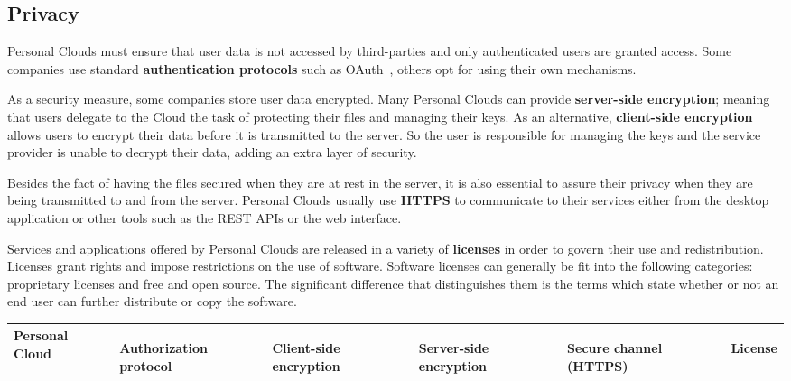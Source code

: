 {\subsection{Privacy}


Personal Clouds must ensure that user data is not accessed by third-parties and only authenticated users are granted access. Some companies use standard \textbf{authentication protocols} such as OAuth~\cite{oauth}, others opt for using their own mechanisms.

As a security measure, some companies store user data encrypted. Many Personal Clouds can provide \textbf{server-side encryption}; meaning that users delegate to the Cloud the task of protecting their files and managing their keys. As an alternative, \textbf{client-side encryption} allows users to encrypt their data before it is transmitted to the server. So the user is responsible for managing the keys and the service provider is unable to decrypt their data, adding an extra layer of security.

Besides the fact of having the files secured when they are at rest in the server, it is also essential to assure their privacy when they are being transmitted to and from the server. Personal Clouds usually use \textbf{HTTPS} to communicate to their services either from the desktop application or other tools such as the REST APIs or the web interface.

Services and applications offered by Personal Clouds are released in a variety of \textbf{licenses} in order to govern their use and redistribution. Licenses grant rights and impose restrictions on the use of software. Software licenses can generally be fit into the following categories: proprietary licenses and free and open source. The significant difference that distinguishes them is the terms which state whether or not an end user can further distribute or copy the software.


{
\def\arraystretch{1.5}

\begin{table}
\begin{center}
    \begin{tabular}{ | p{3.3cm} | p{2.5cm} | p{1.2cm} | p{1.9cm} | p{1.2cm} | p{3.8cm} | }
    \hline
    \rowcolor[gray]{0.8}

	\textbf{Personal Cloud} &
	\begin{sideways}\textbf{Authorization protocol}\end{sideways} &
	\begin{sideways}\textbf{Client-side encryption}\end{sideways} &
	\begin{sideways}\textbf{Server-side encryption}\end{sideways} & 
	\begin{sideways}\textbf{Secure channel (HTTPS)}\end{sideways} &
	\begin{sideways}\textbf{License}\end{sideways} \\ \hline
	

\end{tabular}
\end{center}
\end{table}}}
